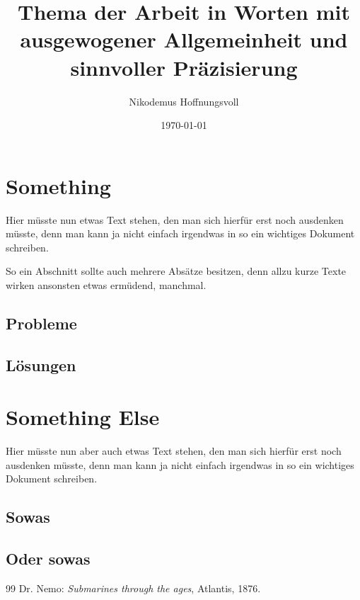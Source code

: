 \documentclass[a4paper,
DIV=13,
12pt,
BCOR=10mm,
department=FakEI,
twoside,
parskip=half,
automark,
logostyle=flat,
]{OTHRartcl}
\date{\today}
\title{Thema der Arbeit in Worten mit ausgewogener Allgemeinheit und sinnvoller Präzisierung}
\author{Nikodemus Hoffnungsvoll}
\begin{document}
\maketitle

\tableofcontents


\section{Something}

Hier müsste nun etwas Text stehen, den man sich hierfür erst noch ausdenken müsste, denn man kann ja nicht einfach irgendwas in so ein wichtiges Dokument schreiben.

So ein Abschnitt sollte auch mehrere Absätze besitzen, denn allzu kurze Texte wirken ansonsten etwas ermüdend, manchmal.

\lipsum[6]
\lipsum[2]

\subsection{Probleme}

\lipsum[0]


\lipsum[3]

\lipsum[4]


\subsection{Lösungen}

\lipsum[1]

\lipsum[4]

\lipsum[6]



\section{Something Else}

Hier müsste nun aber auch etwas Text stehen, den man sich hierfür erst noch ausdenken müsste, denn man kann ja nicht einfach irgendwas in so ein wichtiges Dokument schreiben.

\subsection{Sowas}

\lipsum

\subsection{Oder sowas}

\lipsum


\cleardoublepage
\appendix
\listoffigures

\cleardoublepage
\begin{thebibliography}{99}
 Dr. Nemo: \textit{Submarines through the ages}, Atlantis, 1876.
\end{thebibliography}

\cleardoublepage
\makedeclaration
\end{document}
